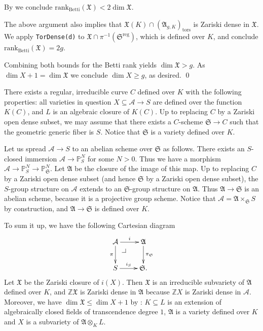 \documentclass[12pt,oneside]{amsart}
\makeatletter
\numberwithin{maincounter}{section}
\numberwithin{equation}{section}
\def\ZZ{\mathbb{Z}}
\def\PP{\mathbb{P}}
\newcommand{\cal}{\mathcal}
\newcommand{\cA}{\cal{A}}
\newcommand{\IP}{{\PP}}
\newcommand{\pullbackcorner}[1][dr]{\save*!/#1-1.7pc/#1:(-1.5,1.5)@^{|-}\restore}
\makeatother
\begin{document}
By \cite[Theorem~1.7]{GaoBettiRank} we conclude
$\mathrm{rank}_{\mathrm{Betti}}(\mathfrak{X}) < 2\dim \mathfrak{X}$.

The above argument also implies that
$\mathfrak{X}(K)\cap(\mathfrak{A}_{g,K})_{\mathrm{tors}}$ is Zariski
dense in $\mathfrak X$. We apply \texttt{TorDense(d)} to
$\mathfrak{X}\cap\pi^{-1}(\mathfrak{S}^{\mathrm{reg}})$, which is
defined over $K$, and conclude
$\mathrm{rank}_{\mathrm{Betti}}(\mathfrak{X}) =2g $.

Combining both bounds for the Betti rank yields $\dim\mathfrak X > g$.
As $\dim X + 1 = \dim \mathfrak{X}$ we conclude $\dim X\ge g$, as desired. \qed
\iffalse

There exists a regular, irreducible curve $C$ defined over $K$ with the following properties: all varieties in question $X \subseteq \cA \rightarrow S$ are defined over the function $K(C)$, and $L$ is an algebraic closure of $K(C)$. Up to replacing $C$ by a Zariski open dense subset, we may assume that there exists a $C$-scheme $\mathfrak{S} \rightarrow C$ such that the geometric generic fiber is $S$. Notice that $\mathfrak{S}$ is a variety defined over $K$.

Let us spread $\cA \rightarrow S$ to an abelian scheme over $\mathfrak{S}$ as follows. There exists an $S$-closed immersion $\cA \rightarrow \IP_S^N$ for some $N > 0$. Thus we have a morphism $\cA \rightarrow \IP_S^N \rightarrow \IP_{\mathfrak{S}}^N$. Let $\mathfrak{A}$ be the closure of the image of this map. Up to replacing $C$ by a Zariski open dense subset (and hence $\mathfrak{S}$ by a Zariski open dense subset), the $S$-group structure on $\cA$ extends to an $\mathfrak{S}$-group structure on $\mathfrak{A}$. Thus $\mathfrak{A} \rightarrow \mathfrak{S}$ is an abelian scheme, because it is a projective group scheme. Notice that $\cA = \mathfrak{A} \times_{\mathfrak{S}} S$ by construction, and $\mathfrak{A} \rightarrow \mathfrak{S}$ is defined over $K$.

To sum it up, we have the following Cartesian diagram%
\begin{equation*}
  \xymatrix{
    \cA \ar[r]^-{i} \ar[d]_-{\pi} \pullbackcorner & \mathfrak{A} \ar[d]^-{\pi_{\mathfrak{S}}} \\
    S \ar[r]^-{i_S}   & \mathfrak{S}.
  }
\end{equation*}
Let $\mathfrak{X}$ be the Zariski closure of $i(X)$. 
Then $\mathfrak{X}$ is an irreducible subvariety of $\mathfrak{A}$ defined over $K$, and $\ZZ \mathfrak{X}$ is Zariski dense in $\mathfrak{A}$ because $\ZZ X$ is Zariski dense in $\cA$. Moreover, we have $\dim \mathfrak{X} \le \dim X + 1$ by \cite[Lemma~2.2]{BarDill}: $K \subseteq L$ is an extension of algebraically closed fields of transcendence degree $1$, $\mathfrak{A}$ is a variety defined over $K$ and $X$ is a subvariety of $\mathfrak{A}\otimes_K L$. 
\end{document}
